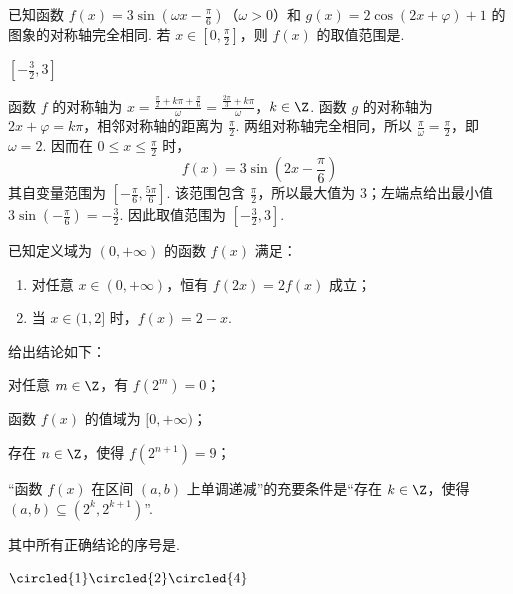 \begin{problem}
已知函数 \( f(x) = 3\sin \left( \omega x - \frac{\pi}{6} \right) \)（\(\omega > 0\)）和 \( g(x) = 2\cos (2x + \varphi) + 1 \) 的图象的对称轴完全相同. 若 \( x \in \left[0, \frac{\pi}{2}\right] \)，则 \( f(x) \) 的取值范围是\fillinblank{}.
\end{problem}

\begin{answer}
\(\left[-\frac{3}{2},3\right]\)
\end{answer}

\begin{solution}
函数 \(f\) 的对称轴为
\(x=\frac{\frac{\pi}{2}+k\pi+\frac{\pi}{6}}{\omega}=\frac{\frac{2\pi}{3}+k\pi}{\omega}\)，\(k\in\Z\).
函数 \(g\) 的对称轴为 \(2x+\varphi=k\pi\)，相邻对称轴的距离为 \(\frac{\pi}{2}\). 两组对称轴完全相同，所以 \(\frac{\pi}{\omega}=\frac{\pi}{2}\)，即 \(\omega=2\). 因而在 \(0\leqslant x\leqslant\frac{\pi}{2}\) 时，
\[
f(x)=3\sin\left(2x-\frac{\pi}{6}\right)
\]
其自变量范围为 \(\left[-\frac{\pi}{6},\frac{5\pi}{6}\right]\). 该范围包含 \(\frac{\pi}{2}\)，所以最大值为 \(3\)；左端点给出最小值 \(3\sin\left(-\frac{\pi}{6}\right)=-\frac{3}{2}\). 因此取值范围为 \(\left[-\frac{3}{2},3\right]\).
\end{solution}

\begin{problem}
已知定义域为 \((0, +\infty)\) 的函数 \(f(x)\) 满足：
\begin{enumerate}
\item 对任意 \(x \in (0, +\infty)\)，恒有 \(f(2x) = 2f(x)\) 成立；
\item 当 \(x \in (1, 2]\) 时，\(f(x) = 2 - x\).
\end{enumerate}
给出结论如下：
\begin{circlelist}
\item 对任意 \( m \in \Z \)，有 \( f(2^{m}) = 0 \)；
\item 函数 \( f(x) \) 的值域为 \( [0, +\infty) \)；
\item 存在 \( n \in \Z \)，使得 \( f(2^{n+1}) = 9 \)；
\item “函数 \( f(x) \) 在区间 \( (a, b) \) 上单调递减”的充要条件是“存在 \( k \in \Z \)，使得 \( (a, b) \subseteq (2^{k}, 2^{k+1}) \)”.
\end{circlelist}
其中所有正确结论的序号是\fillinblank{}.
\end{problem}

\begin{answer}
\(\circled{1}\circled{2}\circled{4}\)
\end{answer}

